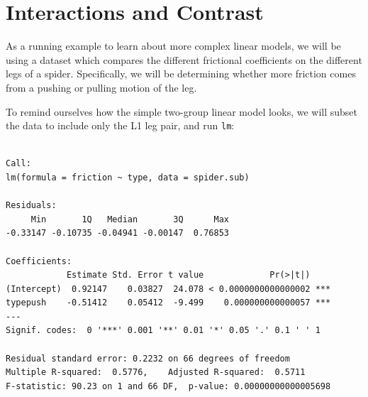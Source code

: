 \documentclass[
  letterpaper,
  DIV=11,
  numbers=noendperiod]{scrartcl}
\newenvironment{Shaded}{\begin{snugshade}}{\end{snugshade}}
\newcommand{\AttributeTok}[1]{\textcolor[rgb]{0.40,0.45,0.13}{#1}}
\newcommand{\FunctionTok}[1]{\textcolor[rgb]{0.28,0.35,0.67}{#1}}
\newcommand{\NormalTok}[1]{\textcolor[rgb]{0.00,0.23,0.31}{#1}}
\newcommand{\OtherTok}[1]{\textcolor[rgb]{0.00,0.23,0.31}{#1}}
\newcommand{\SpecialCharTok}[1]{\textcolor[rgb]{0.37,0.37,0.37}{#1}}
\newcommand{\StringTok}[1]{\textcolor[rgb]{0.13,0.47,0.30}{#1}}
\begin{document}
\section{Interactions and Contrast}\label{interactions-and-contrast}

As a running example to learn about more complex linear models, we will
be using a dataset which compares the different frictional coefficients
on the different legs of a spider. Specifically, we will be determining
whether more friction comes from a pushing or pulling motion of the leg.

To remind ourselves how the simple two-group linear model looks, we will
subset the data to include only the L1 leg pair, and run \texttt{lm}:

\begin{Shaded}
\end{Shaded}

\begin{verbatim}

Call:
lm(formula = friction ~ type, data = spider.sub)

Residuals:
     Min       1Q   Median       3Q      Max 
-0.33147 -0.10735 -0.04941 -0.00147  0.76853 

Coefficients:
            Estimate Std. Error t value             Pr(>|t|)    
(Intercept)  0.92147    0.03827  24.078 < 0.0000000000000002 ***
typepush    -0.51412    0.05412  -9.499    0.000000000000057 ***
---
Signif. codes:  0 '***' 0.001 '**' 0.01 '*' 0.05 '.' 0.1 ' ' 1

Residual standard error: 0.2232 on 66 degrees of freedom
Multiple R-squared:  0.5776,    Adjusted R-squared:  0.5711 
F-statistic: 90.23 on 1 and 66 DF,  p-value: 0.00000000000005698
\end{verbatim}
\end{document}
